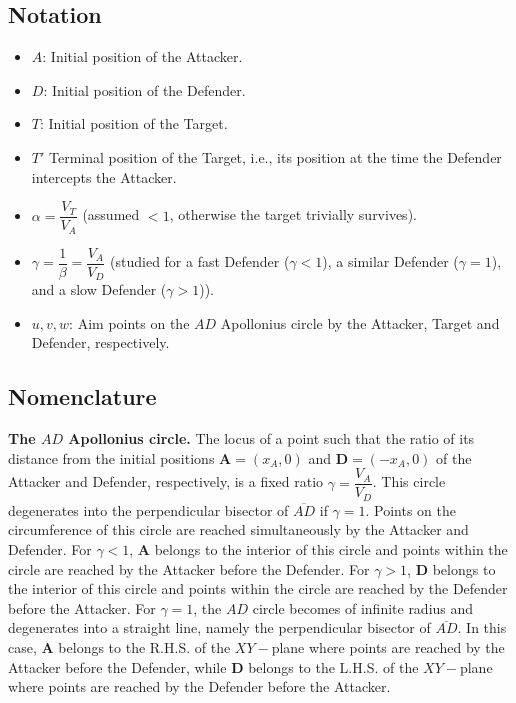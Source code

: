 \subsection*{Notation}
\begin{itemize}
\item $A$: Initial position of the Attacker.
\item $D$: Initial position of the Defender.
\item $T$: Initial position of the Target.
\item $T'$ Terminal position of the Target, i.e., its position at the time the Defender intercepts the Attacker.
\item $\alpha=\dfrac{V_{T}}{V_{A}}$ (assumed $<1$, otherwise the target trivially survives).
\item $\gamma=\dfrac{1}{\beta}=\dfrac{V_{A}}{V_{D}}$ (studied for a fast Defender ($\gamma<1$), a similar Defender ($\gamma=1$), and a slow Defender ($\gamma>1$)).
\item $u, v, w$: Aim points on the $AD$ Apollonius circle by the Attacker, Target and Defender, respectively. 
\end{itemize}

\subsection*{Nomenclature}
\textbf{The $AD$ Apollonius circle.} The locus of a point such that the ratio of its distance from the initial positions $\boldsymbol{A}=(x_{A},0)$ and $\boldsymbol{D}=(-x_{A},0)$ of the Attacker and Defender, respectively, is a fixed ratio $\gamma=\dfrac{V_{A}}{V_{D}}$. This circle degenerates into the perpendicular bisector of $\overline{AD}$ if $\gamma=1$.
Points on the circumference of this circle are reached simultaneously by the Attacker and Defender. For $\gamma<1$, $\boldsymbol{A}$ belongs to the interior of this circle and points within the circle are reached by the Attacker before the Defender. For $\gamma>1$, $\boldsymbol{D}$ belongs to the interior of this circle and points within the circle are reached by the Defender before the Attacker. For $\gamma=1$, the $AD$ circle becomes of infinite radius and degenerates into a straight line, namely the perpendicular bisector of $\overline{AD}$. In this case, $\boldsymbol{A}$ belongs to the R.H.S. of the $XY-$plane where points are reached by the Attacker before the Defender, while $\boldsymbol{D}$ belongs to the L.H.S. of the $XY-$plane where points are reached by the Defender before the Attacker.   

